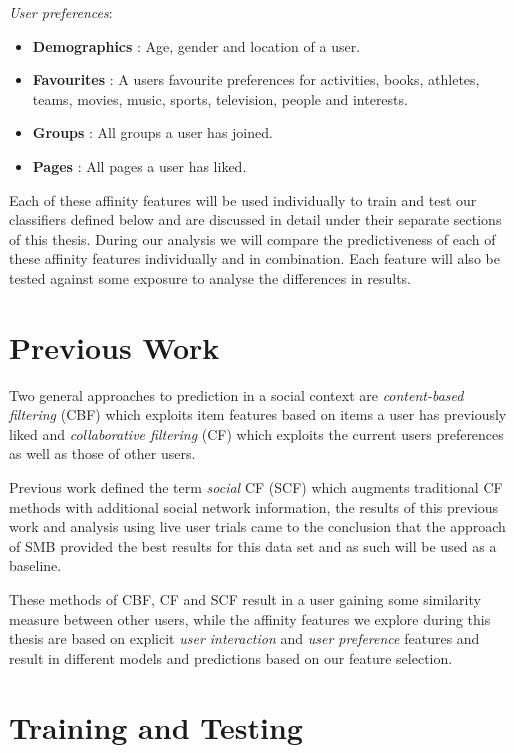\emph{User preferences}:
\begin{itemize}
\item \textbf{Demographics} : Age, gender and location of a user.
\item \textbf{Favourites} : A users favourite preferences for activities, books, athletes, teams, movies, music, sports, television, people and interests.
\item \textbf{Groups} : All groups a user has joined.
\item \textbf{Pages} :  All pages a user has liked.
\end{itemize}

Each of these affinity features will be used individually to train and test our classifiers defined below and are discussed 
in detail under their separate sections of this thesis.
During our analysis we will compare the predictiveness of each of these affinity features individually and in combination.
Each feature will also be tested against some exposure to analyse the differences in results.

\section{Previous Work}
\label{sec:pw}

Two general approaches to prediction in a social context are \emph{content-based filtering} (CBF) \cite{newsweeder} which exploits 
item features based on items a user has previously liked and  \emph{collaborative filtering} (CF) 
\cite{collab_filtering} which exploits the current users preferences as well as those of other users. 

Previous work defined the term \emph{social} CF (SCF) \cite{joseph} which augments traditional CF methods with additional social 
network information, the results of this previous work and analysis using live user trials came to the conclusion that the approach of SMB
provided the best results for this data set and as such will be used as a baseline.

These methods of CBF, CF and SCF result in a user gaining some similarity measure between other users, while the affinity features we 
explore during this thesis are based on explicit \emph{user interaction} and \emph{user preference} features and result in different 
models and predictions based on our feature selection.

\section{Training and Testing}
\label{sec:tt}

